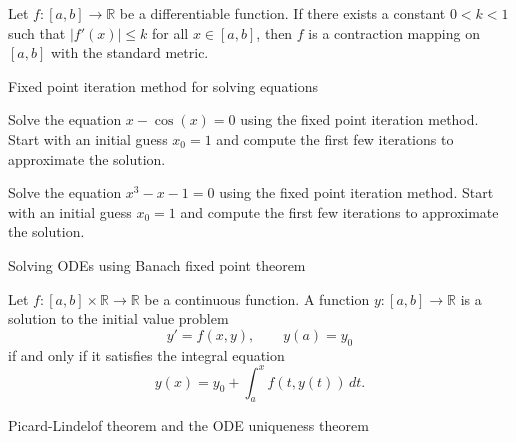 \documentclass[12pt, a4paper]{article}
\begin{document}
\clearpage

\begin{theorem}
    Let $f: [a,b] \to \mathbb{R}$ be a differentiable function. If there exists a constant $0 < k < 1$ such that $|f'(x)| \leq k$ for all $x \in [a,b]$, then $f$ is a contraction mapping on $[a,b]$ with the standard metric.
\end{theorem}

\clearpage

\begin{heading}
    Fixed point iteration method for solving equations
\end{heading}

\clearpage

\begin{problem}
    Solve the equation $x - \cos(x) = 0$ using the fixed point iteration method. Start with an initial guess $x_0 = 1$ and compute the first few iterations to approximate the solution.
\end{problem}

\clearpage


\begin{problem}
    Solve the equation $x^3 - x - 1 = 0$ using the fixed point iteration method. Start with an initial guess $x_0 = 1$ and compute the first few iterations to approximate the solution.
\end{problem}

\clearpage

\begin{heading}
    Solving ODEs using Banach fixed point theorem
\end{heading}

\vspace{10pt}

\begin{theorem}
    Let $f: [a,b] \times \mathbb{R} \to \mathbb{R}$ be a continuous function. A function $y: [a,b] \to \mathbb{R}$ is a solution to the initial value problem
    \[
        y' = f(x,y), \qquad y(a) = y_0
    \]
    if and only if it satisfies the integral equation
    \[
        y(x) = y_0 + \int_a^x f(t, y(t))\, dt.
    \]
    
\end{theorem}

\clearpage

\begin{heading}
    Picard-Lindelof theorem and the ODE uniqueness theorem
\end{heading}
\end{document}
